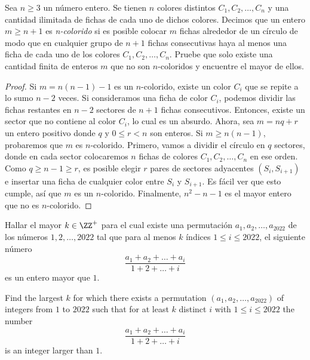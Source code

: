 \begin{probEG}
	Sea $n\ge 3$ un número entero. Se tienen $n$ colores distintos $C_1,C_2,\dots,C_n$ y una cantidad ilimitada de fichas de cada uno de dichos colores. Decimos que un entero $m\ge n+1$ es \emph{n-colorido} si es posible colocar $m$ fichas alrededor de un círculo de modo que en cualquier grupo de $n+1$ fichas consecutivas haya al menos una ficha de cada uno de los colores $C_1,C_2,\dots,C_n$. Pruebe que solo existe una cantidad finita de enteros $m$ que no son $n$-coloridos y encuentre el mayor de ellos.
\end{probEG}

\begin{proof}
	Si $m=n(n-1)-1$ es un $n$-colorido, existe un color $C_i$ que se repite a lo sumo $n-2$ veces. Si consideramos una ficha de color $C_i$, podemos dividir las fichas restantes en $n-2$ sectores de $n+1$ fichas consecutivos. Entonces, existe un sector que no contiene al color $C_i$, lo cual es un absurdo. Ahora, sea $m=nq+r$ un entero positivo donde $q$ y $0\le r<n$ son enteros. Si $m\ge n(n-1)$, probaremos que $m$ es $n$-colorido. Primero, vamos a dividir el círculo en $q$ sectores, donde en cada sector colocaremos $n$ fichas de colores $C_1,C_2,\dots,C_n$ en ese orden. Como $q\ge n-1\ge r$, es posible elegir $r$ pares de sectores adyacentes $(S_i,S_{i+1})$ e insertar una ficha de cualquier color entre $S_i$ y $S_{i+1}$. Es fácil ver que esto cumple, así que $m$ es un $n$-colorido. Finalmente, $n^2-n-1$ es el mayor entero que no es $n$-colorido.
\end{proof}


\begin{probEG}
	Hallar el mayor $k\in\ZZ^+$ para el cual existe una permutación $a_1,a_2,\dots,a_{2022}$ de los números $1,2,\dots,2022$ tal que para al menos $k$ índices $1\le i\le 2022$, el siguiente número
	\[\frac{a_1+a_2+\dots+a_i}{1+2+\dots+i}\]
	es un entero mayor que $1$.
	\begin{hint}
		Find the largest $k$ for which there exists a permutation $(a_1,a_2,\dots,a_{2022})$ of integers from $1$ to $2022$ such that for at least $k$ distinct $i$ with $1\le i\le 2022$ the number
		\[\frac{a_1+a_2+\dots+a_i}{1+2+\dots+i}\]
		is an integer larger than $1$.
	\end{hint}
\end{probEG}

